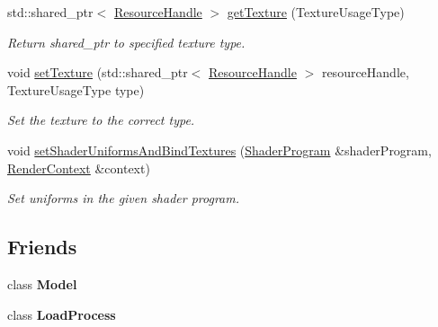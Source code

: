 \begin{Indent}
\begin{DoxyCompactItemize}
\mbox{\label{classrev_1_1_material_ae72301b279fcf390b000d82d9ce57479}} 
std\+::shared\+\_\+ptr$<$ \mbox{\hyperlink{classrev_1_1_resource_handle}{Resource\+Handle}} $>$ \mbox{\hyperlink{classrev_1_1_material_ae72301b279fcf390b000d82d9ce57479}{get\+Texture}} (Texture\+Usage\+Type)
\begin{DoxyCompactList}\small\item\em Return shared\+\_\+ptr to specified texture type. \end{DoxyCompactList}\item 
\mbox{\label{classrev_1_1_material_a84b0e6c48fbc33c8d228a5eb06db9f54}} 
void \mbox{\hyperlink{classrev_1_1_material_a84b0e6c48fbc33c8d228a5eb06db9f54}{set\+Texture}} (std\+::shared\+\_\+ptr$<$ \mbox{\hyperlink{classrev_1_1_resource_handle}{Resource\+Handle}} $>$ resource\+Handle, Texture\+Usage\+Type type)
\begin{DoxyCompactList}\small\item\em Set the texture to the correct type. \end{DoxyCompactList}\item 
\mbox{\label{classrev_1_1_material_aaecb079e8f798605d92ea2f653f3a365}} 
void \mbox{\hyperlink{classrev_1_1_material_aaecb079e8f798605d92ea2f653f3a365}{set\+Shader\+Uniforms\+And\+Bind\+Textures}} (\mbox{\hyperlink{classrev_1_1_shader_program}{Shader\+Program}} \&shader\+Program, \mbox{\hyperlink{classrev_1_1_render_context}{Render\+Context}} \&context)
\begin{DoxyCompactList}\small\item\em Set uniforms in the given shader program. \end{DoxyCompactList}\end{DoxyCompactItemize}
\end{Indent}
\subsection*{Friends}
\begin{DoxyCompactItemize}
\item 
\mbox{\label{classrev_1_1_material_a2bf2a0e9b454c55aa5dcb5aa4698697b}} 
class {\bfseries Model}
\item 
\mbox{\label{classrev_1_1_material_af08a66cdff89abe314f17f213ef57b66}} 
class {\bfseries Load\+Process}
\end{DoxyCompactItemize}
